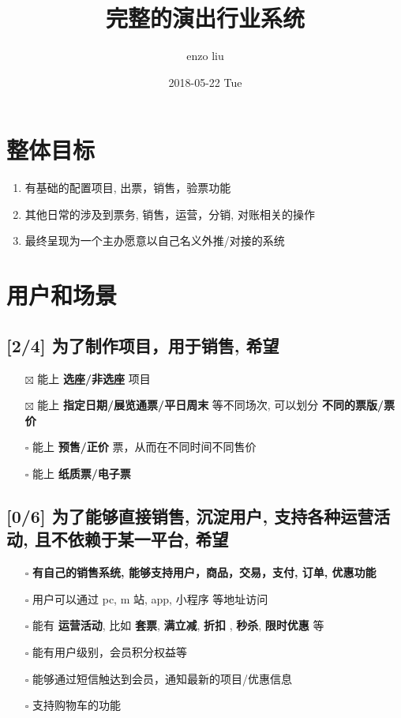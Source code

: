 \documentclass[11pt,a4paper]{article}
\author{enzo liu}
\date{2018-05-22 Tue}
\title{完整的演出行业系统}
\begin{document}
\maketitle
\tableofcontents


\section*{整体目标}
\label{sec:org31fa064}

\begin{enumerate}
\item 有基础的配置项目, 出票，销售，验票功能
\item 其他日常的涉及到票务, 销售，运营，分销, 对账相关的操作
\item 最终呈现为一个主办愿意以自己名义外推/对接的系统
\end{enumerate}

\section*{用户和场景}
\label{sec:org03764cc}
\subsection*{[2/4] 为了制作项目，用于销售, 希望}
\label{sec:org1ac0e00}
\begin{itemize}
\item[{$\boxtimes$}] 能上 \textbf{选座/非选座} 项目
\item[{$\boxtimes$}] 能上 \textbf{指定日期/展览通票/平日周末} 等不同场次, 可以划分 \textbf{不同的票版/票价}
\item[{$\square$}] 能上 \textbf{预售/正价} 票，从而在不同时间不同售价
\item[{$\square$}] 能上 \textbf{纸质票/电子票}
\end{itemize}
\subsection*{[0/6] 为了能够直接销售, 沉淀用户, 支持各种运营活动, 且不依赖于某一平台, 希望}
\label{sec:orgaf34325}
\begin{itemize}
\item[{$\square$}] \textbf{有自己的销售系统, 能够支持用户，商品，交易，支付, 订单, 优惠功能}
\item[{$\square$}] 用户可以通过 pc, m 站, app, 小程序 等地址访问
\item[{$\square$}] 能有 \textbf{运营活动}, 比如 \textbf{套票}, \textbf{满立减}, \textbf{折扣} , \textbf{秒杀}, \textbf{限时优惠} 等
\item[{$\square$}] 能有用户级别，会员积分权益等
\item[{$\square$}] 能够通过短信触达到会员，通知最新的项目/优惠信息
\item[{$\square$}] 支持购物车的功能
\end{itemize}
\end{document}
